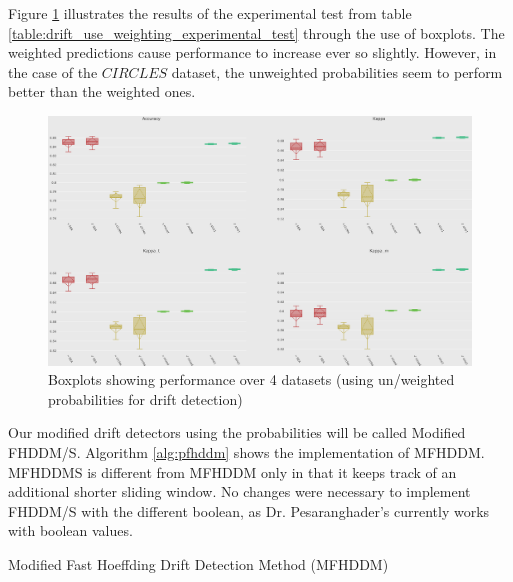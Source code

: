 Figure \ref{fig:boxplot_params_use_w} illustrates the results of the experimental test from table \ref{table:drift_use_weighting_experimental_test} through the use of boxplots. The weighted predictions cause performance to increase ever so slightly. However, in the case of the $CIRCLES$ dataset, the unweighted probabilities seem to perform better than the weighted ones.

\begin{figure}
  \includegraphics[width=\linewidth]{./images/chapter3/boxplot_params_use_w}
\caption{\label{fig:boxplot_params_use_w}Boxplots showing performance over 4 datasets (using un/weighted probabilities for drift detection)}
\end{figure}

Our modified drift detectors using the probabilities will be called Modified FHDDM/S.
Algorithm \ref{alg:pfhddm} shows the implementation of MFHDDM. MFHDDMS is different from MFHDDM only in that it keeps track of an additional shorter sliding window. No changes were necessary to implement FHDDM/S with the different boolean, as Dr. Pesaranghader's currently works with boolean values.

\begin{algorithm}
\caption{Modified Fast Hoeffding Drift Detection Method (MFHDDM)\label{alg:pfhddm}}


\end{algorithm}

